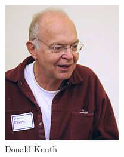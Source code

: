 \documentclass{oblivoir}
\begin{document}
	\noindent
		\begin{figure}
			\centering
			\includegraphics{donaldknuth.jpg}
			\caption{Donald Knuth}
		\end{figure}
\end{document}
